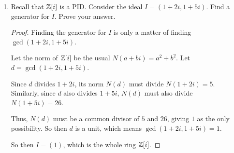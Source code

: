 \documentclass[12pt]{article}
\begin{document}
\begin{enumerate}
		
		\item Recall that $\mathbb{Z}[i]$ is a PID. Consider the ideal $I = (1+2i, 1+5i)$. Find a generator for $I$. Prove your answer.
		\begin{proof}
			Finding the generator for $I$ is only a matter of finding $\gcd(1+2i, 1+5i)$.
			
			Let the norm of $\mathbb{Z}[i]$ be the usual $N(a+bi) = a^2+b^2$. Let $d = \gcd(1+2i,1+5i)$.
			
			Since $d$ divides $1+2i$, its norm $N(d)$ must divide $N(1+2i)=5$. Similarly, since $d$ also divides $1+5i$, $N(d)$ must also divide $N(1 + 5i) = 26$.
			
			Thus, $N(d)$ must be a common divisor of $5$ and $26$, giving $1$ as the only possibility. So then $d$ is a unit, which means $\gcd(1+2i,1+5i) = 1$. 
			
			So then $I = (1)$, which is the whole ring $\mathbb{Z}[i]$.
		\end{proof}
		
	\end{enumerate}
\end{document}
